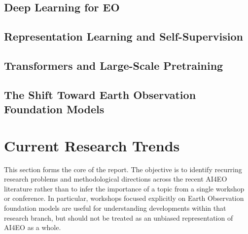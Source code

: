 \documentclass[11pt,a4paper]{article}
\begin{document}
\subsection{Deep Learning for EO}


\subsection{Representation Learning and Self-Supervision}


\subsection{Transformers and Large-Scale Pretraining}


\subsection{The Shift Toward Earth Observation Foundation Models}


\section{Current Research Trends}

This section forms the core of the report. The objective is to identify
recurring research problems and methodological directions across the
recent AI4EO literature rather than to infer the importance of a topic
from a single workshop or conference. In particular, workshops focused
explicitly on Earth Observation foundation models are useful for
understanding developments within that research branch, but should not
be treated as an unbiased representation of AI4EO as a whole.
\end{document}
